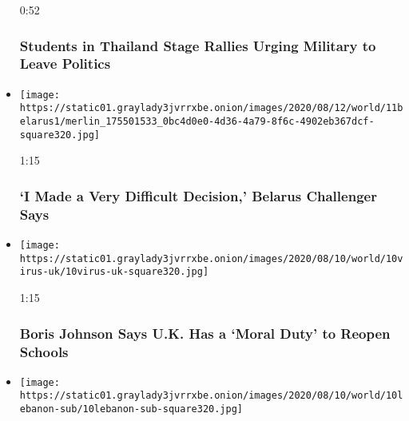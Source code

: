 \begin{itemize}
  0:52

  \hypertarget{students-in-thailand-stage-rallies-urging-military-to-leave-politics}{%
  \subsubsection{Students in Thailand Stage Rallies Urging Military to
  Leave
  Politics}\label{students-in-thailand-stage-rallies-urging-military-to-leave-politics}}
\item
  \href{https://www.nytimes3xbfgragh.onion/video/world/100000007283284/belarus-elections.html?action=click\&module=video-series-bar\&region=header\&pgtype=Article\&playlistId=video/world}{}

  \texttt{[image: https://static01.graylady3jvrrxbe.onion/images/2020/08/12/world/11belarus1/merlin\_175501533\_0bc4d0e0-4d36-4a79-8f6c-4902eb367dcf-square320.jpg]}

  1:15

  \hypertarget{i-made-a-very-difficult-decision-belarus-challenger-says}{%
  \subsubsection{`I Made a Very Difficult Decision,' Belarus Challenger
  Says}\label{i-made-a-very-difficult-decision-belarus-challenger-says}}
\item
  \href{https://www.nytimes3xbfgragh.onion/video/world/europe/100000007282371/boris-moral-duty-reopen-schools.html?action=click\&module=video-series-bar\&region=header\&pgtype=Article\&playlistId=video/world}{}

  \texttt{[image: https://static01.graylady3jvrrxbe.onion/images/2020/08/10/world/10virus-uk/10virus-uk-square320.jpg]}

  1:15

  \hypertarget{boris-johnson-says-uk-has-a-moral-duty-to-reopen-schools}{%
  \subsubsection{Boris Johnson Says U.K. Has a `Moral Duty' to Reopen
  Schools}\label{boris-johnson-says-uk-has-a-moral-duty-to-reopen-schools}}
\item
  \href{https://www.nytimes3xbfgragh.onion/video/us/politics/100000007282089/lebanon-prime-minister-resigns-explosion.html?action=click\&module=video-series-bar\&region=header\&pgtype=Article\&playlistId=video/world}{}

  \texttt{[image: https://static01.graylady3jvrrxbe.onion/images/2020/08/10/world/10lebanon-sub/10lebanon-sub-square320.jpg]}


\end{itemize}
